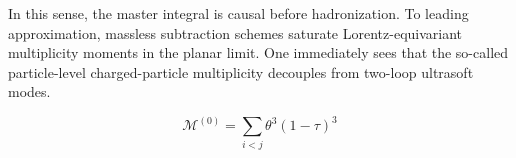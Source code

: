 In this sense, the master integral is causal before hadronization. To
leading approximation, massless subtraction schemes saturate
Lorentz-equivariant multiplicity moments in the planar limit. One
immediately sees that the so-called particle-level charged-particle
multiplicity decouples from two-loop ultrasoft modes.

\begin{equation}
  \mathcal{M}^{(0)} = \sum_{i<j} {\theta}^{3} (1 - \tau)^{3}
  \label{eq:6}
\end{equation}

